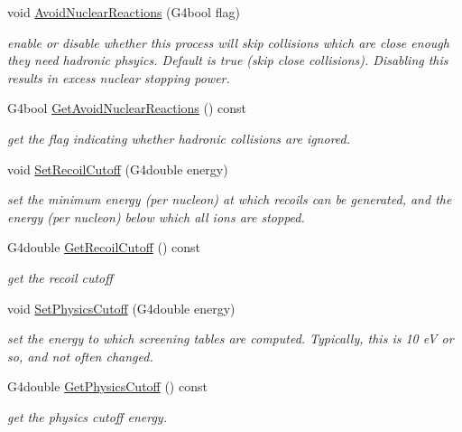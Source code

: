 \begin{DoxyCompactItemize}
void \hyperlink{classG4ScreenedNuclearRecoil_ad22e86de4211cbffd8788e05c022af92}{Avoid\+Nuclear\+Reactions} (G4bool flag)
\begin{DoxyCompactList}\small\item\em enable or disable whether this process will skip collisions which are close enough they need hadronic phsyics. Default is true (skip close collisions). Disabling this results in excess nuclear stopping power. \end{DoxyCompactList}\item 
G4bool \hyperlink{classG4ScreenedNuclearRecoil_a92e935e0c66bfa16608e64edb51077fa}{Get\+Avoid\+Nuclear\+Reactions} () const 
\begin{DoxyCompactList}\small\item\em get the flag indicating whether hadronic collisions are ignored. \end{DoxyCompactList}\item 
void \hyperlink{classG4ScreenedNuclearRecoil_a8be39fad23e6953b217f79174c73e9d2}{Set\+Recoil\+Cutoff} (G4double energy)
\begin{DoxyCompactList}\small\item\em set the minimum energy (per nucleon) at which recoils can be generated, and the energy (per nucleon) below which all ions are stopped. \end{DoxyCompactList}\item 
G4double \hyperlink{classG4ScreenedNuclearRecoil_aa9a631028b0882942e3af26694fbc659}{Get\+Recoil\+Cutoff} () const 
\begin{DoxyCompactList}\small\item\em get the recoil cutoff \end{DoxyCompactList}\item 
void \hyperlink{classG4ScreenedNuclearRecoil_afb8cc92010d3246798fab2eb2983bb4a}{Set\+Physics\+Cutoff} (G4double energy)
\begin{DoxyCompactList}\small\item\em set the energy to which screening tables are computed. Typically, this is 10 eV or so, and not often changed. \end{DoxyCompactList}\item 
G4double \hyperlink{classG4ScreenedNuclearRecoil_adcb1df2fdb14a093551c9d9acc675c5f}{Get\+Physics\+Cutoff} () const 
\begin{DoxyCompactList}\small\item\em get the physics cutoff energy. \end{DoxyCompactList}\item 

\end{DoxyCompactItemize}
